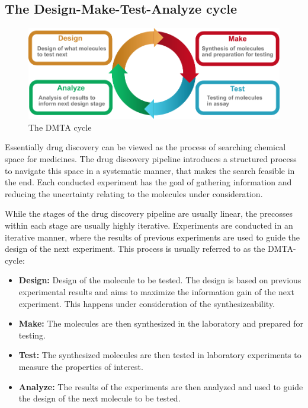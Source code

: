 \subsection{The Design-Make-Test-Analyze cycle}
\begin{figure}
    \centering
    \includegraphics[width=\textwidth]{figures/dmta_cycle.pdf}
    \caption{The DMTA cycle}
\end{figure}
Essentially drug discovery can be viewed as the process of searching 
chemical space for medicines. The drug discovery pipeline introduces 
a structured process to navigate this space in a systematic manner, 
that makes the search feasible in the end. Each conducted experiment
has the goal of gathering information and reducing the uncertainty
relating to the molecules under consideration.

While the stages of the drug discovery pipeline are usually linear, the
precosses within each stage are usually highly iterative. Experiments are
conducted in an iterative manner, where the results of previous experiments are
used to guide the design of the next experiment. This process is usually
referred to as the \ac{DMTA}-cycle:
\begin{itemize}
    \item \textbf{Design:} Design of the molecule to be
    tested. The design is based on previous experimental results and
    aims to maximize the information gain of the next experiment.
    This happens under consideration of the synthesizeability.
    \item \textbf{Make:} The molecules are then synthesized in the laboratory
    and prepared for testing.
    \item \textbf{Test:} The synthesized molecules are then tested in
    laboratory experiments to measure the properties of interest.
    \item \textbf{Analyze:} The results of the experiments are then analyzed
    and used to guide the design of the next molecule to be tested.
\end{itemize}

